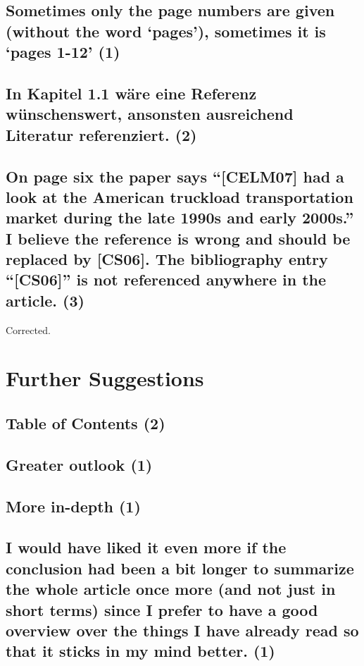 \documentclass{"../../Datenanalyse/assignments/latex-brookesassignment/brookes-assignment"}
\begin{document}
\subsection{Sometimes only the page numbers are given (without the word `pages'), sometimes it is `pages 1-12' (1)}
\subsection{In Kapitel 1.1 wäre eine Referenz wünschenswert, ansonsten ausreichend Literatur referenziert. (2)}
\subsection{On page six the paper says ``[CELM07] had a look at the American truckload transportation market during the late 1990s and early 2000s.'' I believe the reference is wrong and should be replaced by [CS06]. The bibliography entry ``[CS06]'' is not referenced anywhere in the article. (3)}
Corrected.

\section{Further Suggestions}
\subsection{Table of Contents (2)}
\subsection{Greater outlook (1)}
\subsection{More in-depth (1)}
\subsection{I would have liked it even more if the conclusion had been a bit longer to summarize the whole article once more (and not just in short terms) since I prefer to have a good overview over the things I have already read so that it sticks in my mind better. (1)}
\end{document}
